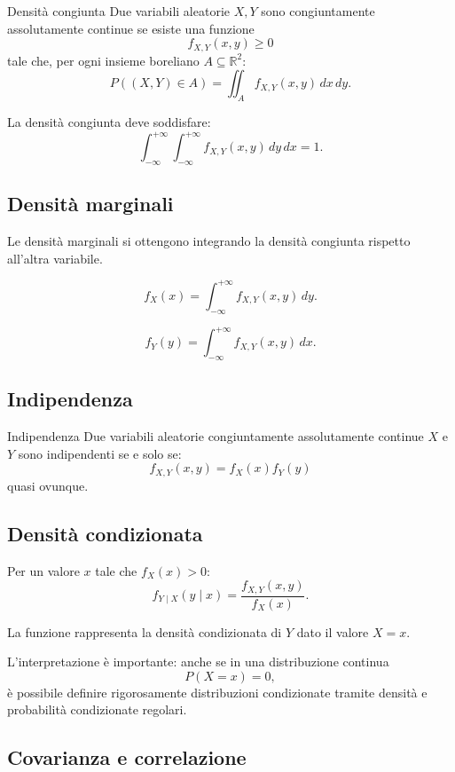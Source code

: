 \begin{definition}{Densità congiunta}
Due variabili aleatorie $X,Y$
sono congiuntamente assolutamente continue
se esiste una funzione
\[
f_{X,Y}(x,y)\geq0
\]
tale che, per ogni insieme
boreliano $A\subseteq\mathbb{R}^2$:
\[
\boxed{
P((X,Y)\in A)
=
\iint_A f_{X,Y}(x,y)\,dx\,dy.
}
\]
\end{definition}

La densità congiunta deve soddisfare:
\[
\boxed{
\int_{-\infty}^{+\infty}
\int_{-\infty}^{+\infty}
f_{X,Y}(x,y)\,dy\,dx
=
1.
}
\]

\subsection{Densità marginali}

Le densità marginali
si ottengono integrando
la densità congiunta
rispetto all'altra variabile.

\[
\boxed{
f_X(x)
=
\int_{-\infty}^{+\infty}
f_{X,Y}(x,y)\,dy.
}
\]

\[
\boxed{
f_Y(y)
=
\int_{-\infty}^{+\infty}
f_{X,Y}(x,y)\,dx.
}
\]

\subsection{Indipendenza}

\begin{definition}{Indipendenza}
Due variabili aleatorie
congiuntamente assolutamente continue
$X$ e $Y$ sono indipendenti
se e solo se:
\[
\boxed{
f_{X,Y}(x,y)=f_X(x)f_Y(y)
}
\]
quasi ovunque.
\end{definition}

\subsection{Densità condizionata}

Per un valore $x$ tale che
$f_X(x)>0$:
\[
\boxed{
f_{Y\mid X}(y\mid x)
=
\frac{f_{X,Y}(x,y)}{f_X(x)}.
}
\]

La funzione rappresenta
la densità condizionata di $Y$
dato il valore $X=x$.

L'interpretazione è importante:
anche se in una distribuzione continua
\[
P(X=x)=0,
\]
è possibile definire
rigorosamente distribuzioni condizionate
tramite densità e probabilità
condizionate regolari.


\subsection{Covarianza e correlazione}

